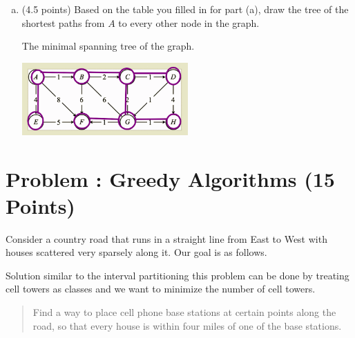 \documentclass[12pt]{amsart}
\newcounter{pNum}
\newcommand{\problem}[2]{\addtocounter{pNum}{1}
\section*{Problem \arabic{pNum}: #1 (#2 Points)}}
\begin{document}
\begin{enumerate}[(a)]
\begin{proof}[Extra details]
1 A\\
2 B\\
E,F nothing happens\\
3 C\\
4 G\\
D nothing happens because H is already updated from G. 
5 H, done\\

shortest path A->B->C->G->H
\end{proof}
\medskip

\item (4.5 points)
Based on the table you filled in for part (a), draw the tree of the shortest paths from $A$ to every other node in the graph.

 The minimal spanning tree of the graph.
 
 \begin{center}
\includegraphics[width=0.5\textwidth]{QQ1.png}
\end{center}


\end{enumerate}


\newpage

\problem{Greedy Algorithms}{15}

Consider a country road that runs in a straight line from East to West  with houses scattered very sparsely along it.   Our goal is as follows.

Solution similar to the interval partitioning this problem can be done by treating cell towers as classes and we want to minimize the number of cell towers.

\begin{quote}
Find a way to place cell phone base stations at certain points along the road, so that every house is within four miles of one of the base stations.  
\end{quote}

\medskip
\end{document}
